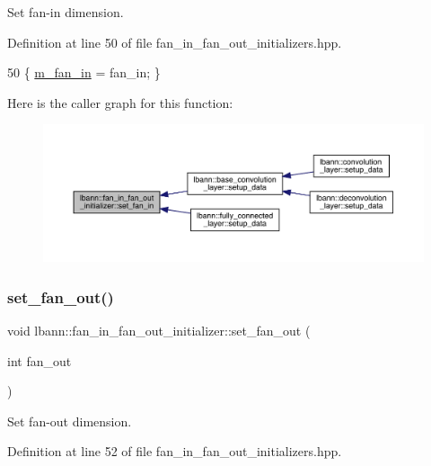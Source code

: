 Set fan-\/in dimension. 

Definition at line 50 of file fan\+\_\+in\+\_\+fan\+\_\+out\+\_\+initializers.\+hpp.


\begin{DoxyCode}
50 \{ \hyperlink{classlbann_1_1fan__in__fan__out__initializer_aea6639db271d9050f0a2e4f8c8dfa6cd}{m\_fan\_in} = fan\_in; \}
\end{DoxyCode}
Here is the caller graph for this function\+:\nopagebreak
\begin{figure}[H]
\begin{center}
\leavevmode
\includegraphics[width=350pt]{classlbann_1_1fan__in__fan__out__initializer_a6da7299bd2fb6aa1b549125fc62ffafc_icgraph}
\end{center}
\end{figure}
\mbox{\label{classlbann_1_1fan__in__fan__out__initializer_a4464e05d66e938058a01be04a2495452}} 
\subsubsection{\texorpdfstring{set\+\_\+fan\+\_\+out()}{set\_fan\_out()}}
{\footnotesize\ttfamily void lbann\+::fan\+\_\+in\+\_\+fan\+\_\+out\+\_\+initializer\+::set\+\_\+fan\+\_\+out (\begin{DoxyParamCaption}\item[{int}]{fan\+\_\+out }\end{DoxyParamCaption})\hspace{0.3cm}{\ttfamily [inline]}}

Set fan-\/out dimension. 

Definition at line 52 of file fan\+\_\+in\+\_\+fan\+\_\+out\+\_\+initializers.\+hpp.


